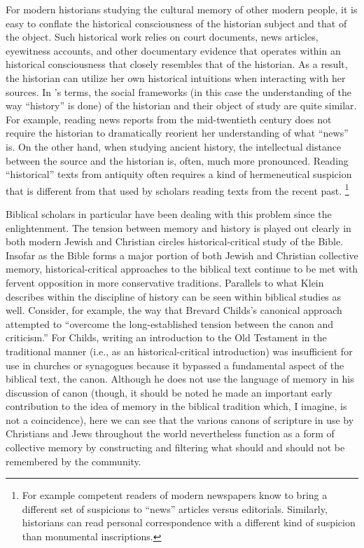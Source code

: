 For modern historians studying the cultural memory of other modern people, it is easy to conflate the historical consciousness of the historian subject and that of the object. Such historical work relies on court documents, news articles, eyewitness accounts, and other documentary evidence that operates within an historical consciousness that closely resembles that of the historian. As a result, the historian can utilize her own historical intuitions when interacting with her sources. In \halbwachs's terms, the social frameworks (in this case the understanding of the way ``history'' is done) of the historian and their object of study are quite similar. For example, reading news reports from the mid-twentieth century does not require the historian to dramatically reorient her understanding of what ``news'' is. On the other hand, when studying ancient history, the intellectual distance between the source and the historian is, often, much more pronounced. Reading ``historical'' texts from antiquity often requires a kind of hermeneutical suspicion that is different from that used by scholars reading texts from the recent past.%
    \footnote{%
        For example competent readers of modern newspapers know to bring a different set of suspicions to ``news'' articles versus editorials. Similarly, historians can read personal correspondence with a different kind of suspicion than monumental inscriptions.}

Biblical scholars in particular have been dealing with this problem since the enlightenment. The tension between memory and history is played out clearly in both modern Jewish and Christian circles \visavis historical-critical study of the Bible. Insofar as the Bible forms a major portion of both Jewish and Christian collective memory, historical-critical approaches to the biblical text continue to be met with fervent opposition in more conservative traditions. Parallels to what Klein describes within the discipline of history can be seen within biblical studies as well. Consider, for example, the way that Brevard Childs's canonical approach attempted to ``overcome the long-established tension between the canon and criticism.''%
    \autocite[45]{childs1979}
For Childs, writing an introduction to the Old Testament in the traditional manner (i.e., as an historical-critical introduction) was insufficient for use in churches or synagogues because it bypassed a fundamental aspect of the biblical text, the canon. Although he does not use the language of memory in his discussion of canon (though, it should be noted he made an important early contribution to the idea of memory in the biblical tradition which, I imagine, is not a coincidence),%
    \autocite{childs1962}
here we can see that the various canons of scripture in use by Christians and Jews throughout the world nevertheless function as a form of collective memory by constructing and filtering what should and should not be remembered by the community.  

